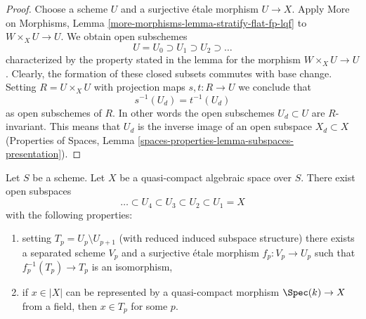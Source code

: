 \begin{proof}
Choose a scheme $U$ and a surjective \'etale morphism $U \to X$. Apply
More on Morphisms, Lemma \ref{more-morphisms-lemma-stratify-flat-fp-lqf}
to $W \times_X U \to U$. We obtain open subschemes
$$
U = U_0 \supset U_1 \supset U_2 \supset \ldots
$$
characterized by the property stated in the lemma for the morphism
$W \times_X U \to U$. Clearly, the formation of these closed subsets commutes
with base change. Setting $R = U \times_X U$ with projection maps
$s, t : R \to U$ we conclude that
$$
s^{-1}(U_d) = t^{-1}(U_d)
$$
as open subschemes of $R$. In other words the open subschemes $U_d \subset U$
are $R$-invariant. This means that $U_d$ is the inverse image of an
open subspace $X_d \subset X$
(Properties of Spaces, Lemma
\ref{spaces-properties-lemma-subspaces-presentation}).
\end{proof}

\begin{lemma}
\label{lemma-filter-quasi-compact}
Let $S$ be a scheme. Let $X$ be a quasi-compact algebraic space
over $S$. There exist open subspaces
$$
\ldots \subset U_4 \subset U_3 \subset U_2 \subset U_1 = X
$$
with the following properties:
\begin{enumerate}
\item setting $T_p = U_p \setminus U_{p + 1}$ (with reduced induced subspace
structure) there exists a separated scheme $V_p$ and a surjective \'etale
morphism $f_p : V_p \to U_p$ such that $f_p^{-1}(T_p) \to T_p$ is an
isomorphism,
\item if $x \in |X|$ can be represented by a quasi-compact morphism
$\Spec(k) \to X$ from a field, then $x \in T_p$ for some $p$.
\end{enumerate}
\end{lemma}


